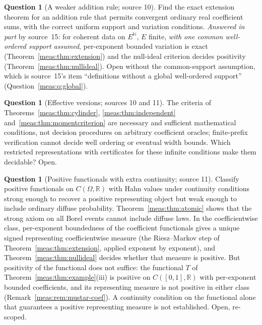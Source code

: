\documentclass[11pt]{article}
\numberwithin{equation}{section}
\theoremstyle{definition}
\newtheorem{question}[theorem]{Question}
\theoremstyle{remark}
\newcommand{\R}{\mathbb R}
\newcommand{\N}{\mathbb N}
\begin{document}
\begin{question}[A weaker addition rule; source 10]\label{meas:q:weaker}
Find the exact extension theorem for an addition rule that permits convergent
ordinary real coefficient sums, with the correct uniform support and variation
conditions. \emph{Answered in part} by source~15: for coherent data on $E^{\N}$,
$E$ finite, \emph{with one common well-ordered support assumed}, per-exponent
bounded variation is exact (Theorem~\ref{meas:thm:extension}) and the null-ideal
criterion decides positivity (Theorem~\ref{meas:thm:nullideal}). Open without the
common-support assumption, which is source~15's item ``definitions without a
global well-ordered support'' (Question~\ref{meas:q:global}).
\end{question}

\begin{question}[Effective versions; sources 10 and 11]\label{meas:q:effective}
The criteria of Theorems~\ref{meas:thm:cylinder}, \ref{meas:thm:independent}
and~\ref{meas:thm:momentcriterion} are necessary and sufficient mathematical
conditions, not decision procedures on arbitrary coefficient oracles; finite-prefix
verification cannot decide well ordering or eventual width bounds. Which restricted
representations with certificates for these infinite conditions make them
decidable? Open.
\end{question}

\begin{question}[Positive functionals with extra continuity; source 11]
\label{meas:q:functionals}
Classify positive functionals on $C(\Omega,\R)$ with Hahn values under continuity
conditions strong enough to recover a positive representing object but weak enough
to include ordinary diffuse probability. Theorem~\ref{meas:thm:atomic} shows that
the strong axiom on all Borel events cannot include diffuse laws. In the
coefficientwise class, per-exponent boundedness of the coefficient functionals gives
a unique signed representing coefficientwise measure (the Riesz--Markov step of
Theorem~\ref{meas:thm:extension}, applied exponent by exponent), and
Theorem~\ref{meas:thm:nullideal} decides whether that measure is positive. But
positivity of the functional does not suffice: the functional $T$ of
Theorem~\ref{meas:thm:example}(iii) is positive on $C([0,1],\R)$ with per-exponent
bounded coefficients, and its representing measure is not positive in either class
(Remark~\ref{meas:rem:mustar-coef}). A continuity condition on the functional alone
that guarantees a positive representing measure is not established. Open,
re-scoped.
\end{question}
\end{document}
